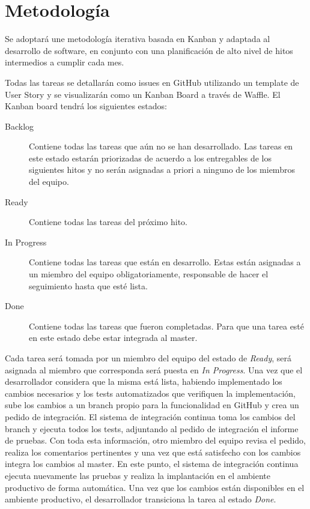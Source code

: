 \documentclass[a4paper,11pt]{article}
\begin{document}
\section{Metodología}

Se adoptará une metodología iterativa basada en Kanban y adaptada al desarrollo
de software, en conjunto con una planificación de alto nivel de hitos
intermedios a cumplir cada mes.

Todas las tareas se detallarán como issues en GitHub utilizando un template de
User Story y se visualizarán como un Kanban Board a través de Waffle. El Kanban
board tendrá los siguientes estados:

\begin{description}

  \item[Backlog] Contiene todas las tareas que aún no se han desarrollado. Las
    tareas en este estado estarán priorizadas de acuerdo a los entregables de
    los siguientes hitos y no serán asignadas a priori a ninguno de los
    miembros del equipo.

  \item[Ready] Contiene todas las tareas del próximo hito.

  \item[In Progress] Contiene todas las tareas que están en desarrollo. Estas
    están asignadas a un miembro del equipo obligatoriamente, responsable de
    hacer el seguimiento hasta que esté lista.

  \item[Done] Contiene todas las tareas que fueron completadas. Para que una
    tarea esté en este estado debe estar integrada al master.

\end{description}

Cada tarea será tomada por un miembro del equipo del estado de \textit{Ready},
será asignada al miembro que corresponda será puesta en \textit{In Progress}.
Una vez que el desarrollador considera que la misma está lista, habiendo
implementado los cambios necesarios y los tests automatizados que verifiquen la
implementación, sube los cambios a un branch propio para la funcionalidad en
GitHub y crea un pedido de integración. El sistema de integración continua toma
los cambios del branch y ejecuta todos los tests, adjuntando al pedido de
integración el informe de pruebas. Con toda esta información, otro miembro del
equipo revisa el pedido, realiza los comentarios pertinentes y una vez que está
satisfecho con los cambios integra los cambios al master. En este punto, el
sistema de integración continua ejecuta nuevamente las pruebas y realiza la
implantación en el ambiente productivo de forma automática. Una vez que los
cambios están disponibles en el ambiente productivo, el desarrollador
transiciona la tarea al estado \textit{Done}.
\end{document}
